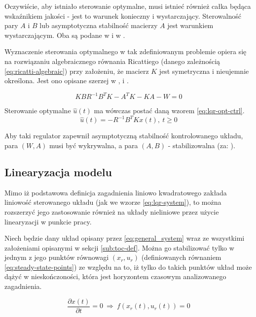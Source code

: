 Oczywiście, aby istniało sterowanie optymalne, musi istnieć również całka będąca wskaźnikiem jakości - jest to warunek konieczny i wystarczający. Sterowalność pary $A$ i $B$ lub asymptotyczna stabilność macierzy $A$ jest warunkiem wystarczającym. Oba są podane w \cite{AthansOptCtrl} i w \cite{Korytowski2015}.

Wyznaczenie sterowania optymalnego w tak zdefiniowanym problemie opiera się na rozwiązaniu algebraicznego równania Ricattiego (danego zależnością \ref{eq:ricatti-algebraic}) przy założeniu, że macierz $K$ jest symetryczna i nieujemnie określona. Jest ono opisane szerzej w \cite{AthansOptCtrl}, \cite{Korytowski2015} i \cite{Murray2006}.

\begin{equation}\label{eq:ricatti-algebraic}
KBR^{-1}B^{T}K - A^{T}K - KA - W =0
\end{equation}

Sterowanie optymalne $\hat{u}(t)$ ma wówczas postać daną wzorem \ref{eq:lqr-opt-ctrl}.
\begin{equation}\label{eq:lqr-opt-ctrl}
\hat{u}(t) = -R^{-1}B^{T}Kx(t),~ t \geq 0
\end{equation}

Aby taki regulator zapewnił asymptotyczną stabilność kontrolowanego układu, para $(W, A)$ musi być wykrywalna, a para $(A, B)$ - stabilizowalna (za: \cite{Korytowski2015}).

\subsection{Linearyzacja modelu}
\label{sub:lqr-lin}

Mimo iż podstawowa definicja zagadnienia liniowo kwadratowego zakłada liniowość sterowanego układu (jak we wzorze \ref{eq:lqr-system}), to można rozszerzyć jego zastosowanie również na układy nieliniowe przez użycie linearyzacji w punkcie pracy.

Niech będzie dany układ opisany przez \ref{eq:general_system} wraz ze wszystkimi założeniami opisanymi w sekcji \ref{sub:toc-def}.
Można go stabilizować tylko w jednym z jego punktów równowagi $(x_{r}, u_{r})$ (definiowanych równaniem \ref{eq:steady-state-points}) ze względu na to, iż tylko do takich punktów układ może dążyć w nieskończoności, która jest horyzontem czasowym analizowanego zagadnienia.

\begin{equation}\label{eq:steady-state-points}
\frac{\partial x(t)}{\partial t} = 0 ~\Rightarrow~ f(x_{r}(t), u_{r}(t)) = 0
\end{equation}

